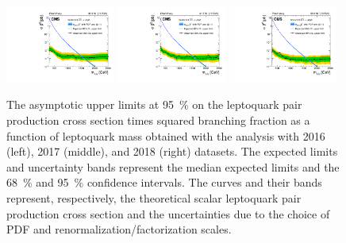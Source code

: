 \begin{figure}[H]
  \centering
  \includegraphics[width=0.32\textwidth]{Images/Analysis/Limits/BR_Sigma_MuMu_2016.pdf}
  \includegraphics[width=0.32\textwidth]{Images/Analysis/Limits/BR_Sigma_MuMu_2017.pdf}
  \includegraphics[width=0.32\textwidth]{Images/Analysis/Limits/BR_Sigma_MuMu_2018.pdf}
  \caption{The asymptotic upper limits at \SI{95}{\%} \CL on the leptoquark pair production cross section times squared branching fraction as a function of leptoquark mass obtained with the \mumubj analysis with 2016 (left), 2017 (middle), and 2018 (right) datasets. The expected limits and uncertainty bands represent the median expected limits and the \SI{68}{\%} and \SI{95}{\%} confidence intervals. The  curves and their bands represent, respectively, the theoretical scalar leptoquark pair production cross section and the uncertainties due to the choice of PDF and renormalization/factorization scales.}
  \label{fig:limit_plots}
\end{figure}

